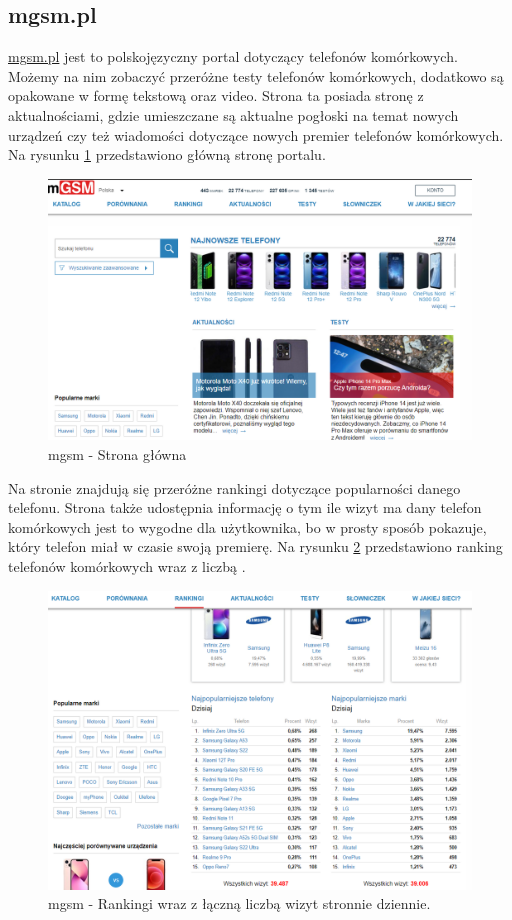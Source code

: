 \subsection{mgsm.pl}
\href{https://www.mgsm.pl/pl/}{mgsm.pl} \cite{mgsm} jest to polskojęzyczny portal dotyczący telefonów komórkowych. Możemy na nim zobaczyć przeróżne testy telefonów komórkowych, dodatkowo są opakowane w formę tekstową oraz video. Strona ta posiada stronę z aktualnościami, gdzie umieszczane są aktualne pogłoski na temat nowych urządzeń czy też wiadomości dotyczące nowych premier telefonów komórkowych. Na rysunku \ref*{mgsm_1} przedstawiono główną stronę portalu.
\begin{figure}[H]
    \centering
    \includegraphics[scale=0.45]{img/mgsm/mgsm.png}
    \caption{mgsm - Strona główna}
    \label{mgsm_1}
\end{figure}
Na stronie znajdują się przeróżne rankingi dotyczące popularności danego telefonu. Strona także udostępnia informację o tym ile wizyt ma dany telefon komórkowych jest to wygodne dla użytkownika, bo w prosty sposób pokazuje, który telefon miał w czasie swoją premierę. Na rysunku \ref*{mgsm_2} przedstawiono ranking telefonów komórkowych wraz z liczbą .
\begin{figure}[H]
    \centering
    \includegraphics[scale=0.4]{img/mgsm/rankingsMgsm.png}
    \caption{mgsm - Rankingi wraz z łączną liczbą wizyt stronnie dziennie.}
    \label{mgsm_2}
\end{figure}
